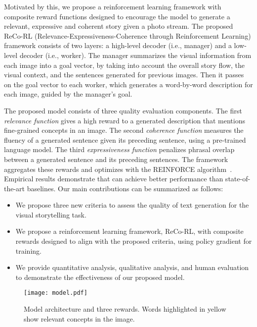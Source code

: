 \documentclass[letterpaper]{article} \usepackage{aaai20}  \usepackage{times}  \usepackage{helvet} \usepackage{courier}  \usepackage[hyphens]{url}  \usepackage{graphicx} \urlstyle{rm} \def\UrlFont{\rm}  \usepackage{graphicx}  \frenchspacing  \setlength{\pdfpagewidth}{8.5in}  \setlength{\pdfpageheight}{11in}  \usepackage{times}
\begin{document}
Motivated by this, we propose a reinforcement learning framework with composite reward functions designed to encourage the model to generate a relevant, expressive and coherent story given a photo stream. The proposed ReCo-RL (Relevance-Expressiveness-Coherence through Reinforcement Learning) framework consists of two layers: a high-level decoder (i.e., manager) and a low-level decoder (i.e., worker). The manager summarizes the visual information from each image into a goal vector, by taking into account the overall story flow, the visual context, and the sentences generated for previous images. Then it passes on the goal vector to each worker, which generates a word-by-word description for each image, guided by the manager's goal.

The proposed model consists of three quality evaluation components. The first \textit{relevance function} gives a high reward to a generated description that mentions fine-grained concepts in an image. The second \textit{coherence function} measures the fluency of a generated sentence given its preceding sentence, using a pre-trained language model. The third \textit{expressiveness function} penalizes phrasal overlap between a generated sentence and its preceding sentences. The framework aggregates these rewards and optimizes with the REINFORCE algorithm~\cite{williams1992simple}. Empirical results demonstrate that \model can achieve better performance than state-of-the-art baselines. Our main contributions can be summarized as follows:
\begin{itemize}
        \item We propose three new criteria to assess the quality of text generation for the visual storytelling task. 
        \item We propose a reinforcement learning framework, ReCo-RL, with composite rewards designed to align with the proposed criteria, using policy gradient for training.
    \item We provide quantitative analysis, qualitative analysis, and human evaluation to demonstrate the effectiveness of our proposed model. 
\end{itemize}

\begin{figure*}
    \centering
    \texttt{[image: model.pdf]}
    \caption{Model architecture and three rewards. Words highlighted in yellow show relevant concepts in the image. }
    \label{fig:my_label}
\end{figure*}
\end{document}

